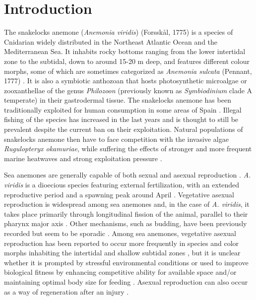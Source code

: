\documentclass[final,3p,times,authoryear]{elsarticle}
\begin{document}



\section{Introduction}
\label{sec1}

The snakelocks anemone (\textit{Anemonia viridis}) (Forsskål, 1775) is a species of Cnidarian widely distributed in the Northeast Atlantic Ocean and the Mediterranean Sea. It inhabits rocky bottoms ranging from the lower intertidal zone to the subtidal, down to around 15-20 m deep, and features different colour morphs, some of which are sometimes categorized as \textit{Anemonia sulcata} (Pennant, 1777) \citep{Mallien2018, Porro2019, CalvnCalvo2020, Porcu2026}. It is also a symbiotic anthozoan that hosts photosynthetic microalgae or zooxanthellae of the genus \textit{Philozoon} (previously known as \textit{Symbiodinium} clade A temperate) \citep{LaJeunesse2022} in their gastrodermal tissue. The snakelocks anemone has been traditionally exploited for human consumption in some areas of Spain \citep{DazaCordero2002, Utrilla2019}. Illegal fishing of the species has increased in the last years and is thought to still be prevalent despite the current ban on their exploitation. Natural populations of snakelocks anemone then have to face competition with the invasive algae \textit{Rugulopteryx okamuriae}, while suffering the effects of stronger and more frequent marine heatwaves and strong exploitation pressure \citep{Suarez2020, Hamdeno2023, Pastor2023, Laamraoui2024}. 

Sea anemones are generally capable of both sexual and asexual reproduction \citep{Bocharova2016, Utrilla2019}. \textit{A. viridis} is a dioecious species featuring external fertilization, with an extended reproductive period and a spawning peak around April \citep{Utrilla2019, Porcu2026}. Vegetative asexual reproduction is widespread among sea anemones and, in the case of \textit{A. viridis}, it takes place primarily through longitudinal fission of the animal, parallel to their pharynx major axis \citep{Bocharova2016, Macias-Muoz2025}. Other mechanisms, such as budding, have been previously recorded but seem to be sporadic \citep{Utrilla2019}. Among sea anemones, vegetative asexual reproduction has been reported to occur more frequently in species and color morphs inhabiting the intertidal and shallow subtidal zones \citep{Schick1991, Mallien2018, Porro2019, Coll2025}, but it is unclear whether it is prompted by stressful environmental conditions or used to improve biological fitness by enhancing competitive ability for available space and/or maintaining optimal body size for feeding \citep{Chia1976, Sebens1979, Schick1991}. Asexual reproduction can also occur as a way of regeneration after an injury \citep{Holstein2003, Amiel2015, Bocharova2016}.
\end{document}
